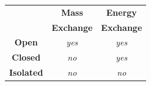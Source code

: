 \documentclass[10pt,compress,handout,ignorenonframetext]{beamer}
\begin{document}
\begin{frame}
\begin{columns}
\begin{column}[l]{0.45\linewidth}
      \begin{tabular}{|c|c|c|}
         \hline
                      & {\bf Mass} & {\bf Energy} \\
                      & {\bf Exchange} & {\bf Exchange} \\
         \hline
         {\bf Open}   & {\it yes}  & {\it yes}    \\
         {\bf Closed} & {\it no}   & {\it yes}    \\
         {\bf Isolated}&{\it no}   & {\it no}     \\
         \hline 
      \end{tabular}    
    \end{column}
  \end{columns}
\end{frame}
\normalsize
\end{document}
